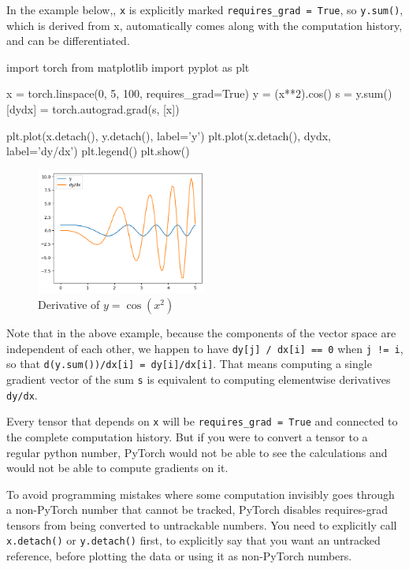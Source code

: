 In the example below,, \texttt{x} is explicitly marked \texttt{requires\_grad = True}, so \texttt{y.sum()}, which is derived from x, automatically comes along with the computation history, and can be differentiated. 

\begin{exampleblock}[Autograd]
    \begin{codeblock}[language=python]
import torch
from matplotlib import pyplot as plt

x = torch.linspace(0, 5, 100,
            requires_grad=True)
y = (x**2).cos()
s = y.sum()
[dydx] = torch.autograd.grad(s, [x])

plt.plot(x.detach(), y.detach(), label='y')
plt.plot(x.detach(), dydx, label='dy/dx')
plt.legend()
plt.show()
    \end{codeblock}
\end{exampleblock}

\begin{figure}[H]
    \centering
    \includegraphics[width=0.5\textwidth]{assets/fig5.png}
    \caption{Derivative of $y = \cos(x^2)$}
\end{figure}

\begin{observationblock}
    Note that in the above example, because the components of the vector space are independent of each other, we happen to have \texttt{dy[j] / dx[i] == 0} when \texttt{j != i}, so that \texttt{d(y.sum())/dx[i] = dy[i]/dx[i]}. That means computing a single gradient vector of the sum \texttt{s} is equivalent to computing elementwise derivatives \texttt{dy/dx}. 
\end{observationblock}

Every tensor that depends on \texttt{x} will be \texttt{requires\_grad = True} and connected to the complete computation history. But if you were to convert a tensor to a regular python number, PyTorch would not be able to see the calculations and would not be able to compute gradients on it. 

To avoid programming mistakes where some computation invisibly goes through a non-PyTorch number that cannot be tracked, PyTorch disables requires-grad tensors from being converted to untrackable numbers. You need to explicitly call \texttt{x.detach()} or \texttt{y.detach()} first, to explicitly say that you want an untracked reference, before plotting the data or using it as non-PyTorch numbers. 

